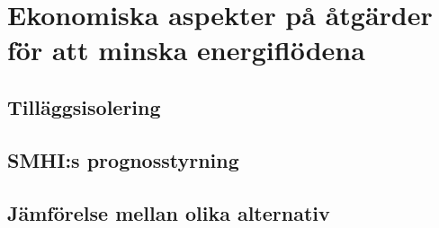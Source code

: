 \section{Ekonomiska aspekter på åtgärder för att minska energiflödena}

\subsection{Tilläggsisolering}

\subsection{SMHI:s prognosstyrning}

\subsection{Jämförelse mellan olika alternativ}